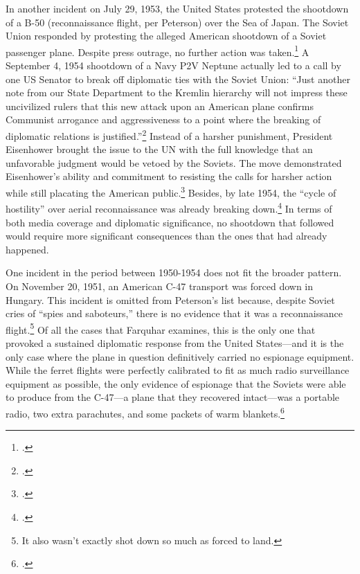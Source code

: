 \documentclass[14pt]{extarticle}
\begin{document}
In another incident on July 29, 1953, the United States protested the shootdown of a B-50 (reconnaissance flight, per Peterson) over the Sea of Japan. The Soviet Union responded by protesting the alleged American shootdown of a Soviet passenger plane. Despite press outrage, no further action was taken.\footcite[p.~47]{farquhar_aerial_2015} A September 4, 1954 shootdown of a Navy P2V Neptune actually led to a call by one US Senator to break off diplomatic ties with the Soviet Union: \enquote{Just another note from our State Department to the Kremlin hierarchy will not impress these uncivilized rulers \textelp{} that this new attack upon an American plane confirms Communist arrogance and aggressiveness to a point where the breaking of diplomatic relations is justified.}\footcite{the_associated_press_ending_1954} Instead of a harsher punishment, President Eisenhower brought the issue to the UN with the full knowledge that an unfavorable judgment would be vetoed by the Soviets. The move demonstrated Eisenhower's ability and commitment to resisting the calls for harsher action while still placating the American public.\footcite[p.~47]{farquhar_aerial_2015} Besides, by late 1954, the \enquote{cycle of hostility} over aerial reconnaissance was already breaking down.\footcite[p.~49]{farquhar_aerial_2015} In terms of both media coverage and diplomatic significance, no shootdown that followed would require more significant consequences than the ones that had already happened.

One incident in the period between 1950-1954 does not fit the broader pattern. On November 20, 1951, an American C-47 transport was forced down in Hungary. This incident is omitted from Peterson's list because, despite Soviet cries of \enquote{spies and saboteurs,} there is no evidence that it was a reconnaissance flight.\footnote{It also wasn't exactly shot down so much as forced to land.} Of all the cases that Farquhar examines, this is the only one that provoked a sustained diplomatic response from the United States---and it is the only case where the plane in question definitively carried no espionage equipment. While the ferret flights were perfectly calibrated to fit as much radio surveillance equipment as possible, the only evidence of espionage that the Soviets were able to produce from the C-47---a plane that they recovered intact---was a portable radio, two extra parachutes, and some packets of warm blankets.\footcite{the_united_press_soviet_1951}
\end{document}
